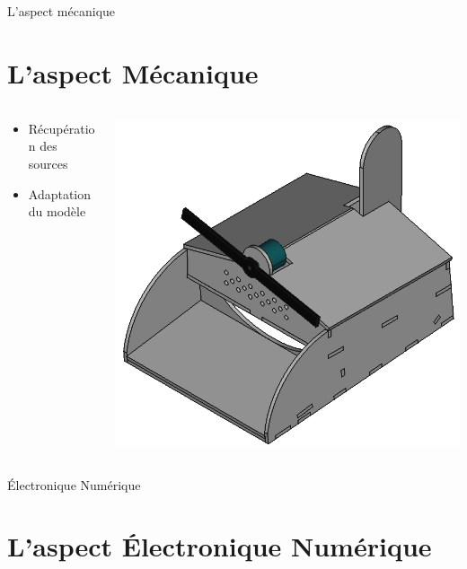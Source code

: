 \documentclass{beamer}
\begin{document}
	\begin{frame}{L'aspect mécanique}
		\section[Mécanique]{L'aspect Mécanique}
		\begin{columns}[T]
	  		\begin{column}{0.5\textwidth}
	    	\begin{itemize}
	    		\item Récupération des sources
	    		\item Adaptation du modèle
	    	\end{itemize}
	  		\end{column}
	  		\begin{column}{0.5\textwidth}
	    	\includegraphics[width=\textwidth]{"../Illus/3Dview.png"}
	  		\end{column}
		\end{columns}
		
	\end{frame}
	\begin{frame}{Électronique Numérique}
		\section[ENUM]{L'aspect Électronique Numérique}
		
	\end{frame}
\end{document}

